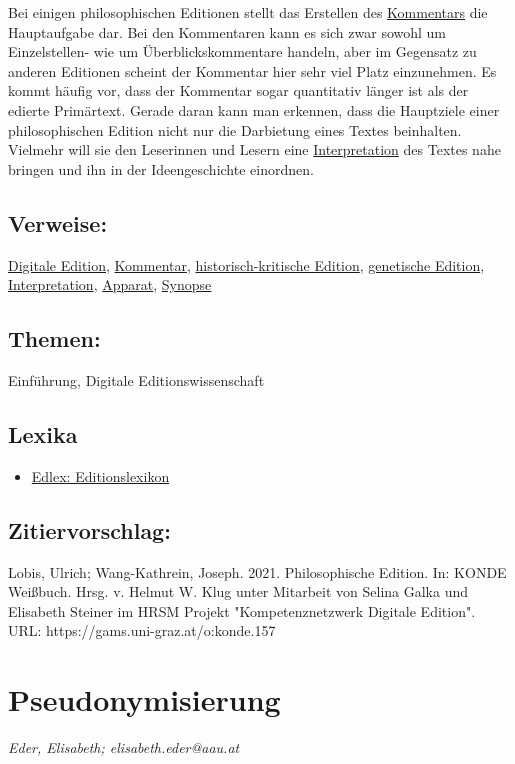 \documentclass{article}
\begin{document}
        Bei einigen philosophischen Editionen stellt das Erstellen des \href{http://gams.uni-graz.at/o:konde.34}{Kommentars} die Hauptaufgabe dar. Bei den Kommentaren kann es sich zwar sowohl um Einzelstellen- wie um Überblickskommentare handeln, aber im Gegensatz zu anderen Editionen scheint der Kommentar hier sehr viel Platz einzunehmen. Es kommt häufig vor, dass der Kommentar sogar quantitativ länger ist als der edierte Primärtext. Gerade daran kann man erkennen, dass die Hauptziele einer philosophischen Edition nicht nur die Darbietung eines Textes beinhalten. Vielmehr will sie den Leserinnen und Lesern eine \href{http://gams.uni-graz.at/o:konde.100}{Interpretation} des Textes nahe bringen und ihn in der Ideengeschichte einordnen.\\
            
        \subsection*{Verweise:}\href{https://gams.uni-graz.at/o:konde.59}{Digitale Edition}, \href{https://gams.uni-graz.at/o:konde.34}{Kommentar}, \href{https://gams.uni-graz.at/o:konde.93}{historisch-kritische Edition}, \href{https://gams.uni-graz.at/o:konde.90}{genetische Edition}, \href{https://gams.uni-graz.at/o:konde.100}{Interpretation}, \href{https://gams.uni-graz.at/o:konde.32}{Apparat}, \href{https://gams.uni-graz.at/o:konde.174}{Synopse}\subsection*{Themen:}Einführung, Digitale Editionswissenschaft\subsection*{Lexika}\begin{itemize}\item \href{https://edlex.de/index.php?title=Philosophische_Edition}{Edlex: Editionslexikon}\end{itemize}\subsection*{Zitiervorschlag:}Lobis, Ulrich; Wang-Kathrein, Joseph. 2021. Philosophische Edition. In: KONDE Weißbuch. Hrsg. v. Helmut W. Klug unter Mitarbeit von Selina Galka und Elisabeth Steiner im HRSM Projekt "Kompetenznetzwerk Digitale Edition". URL: https://gams.uni-graz.at/o:konde.157\newpage\section*{Pseudonymisierung} \emph{Eder, Elisabeth; elisabeth.eder@aau.at }\\
        
\end{document}

